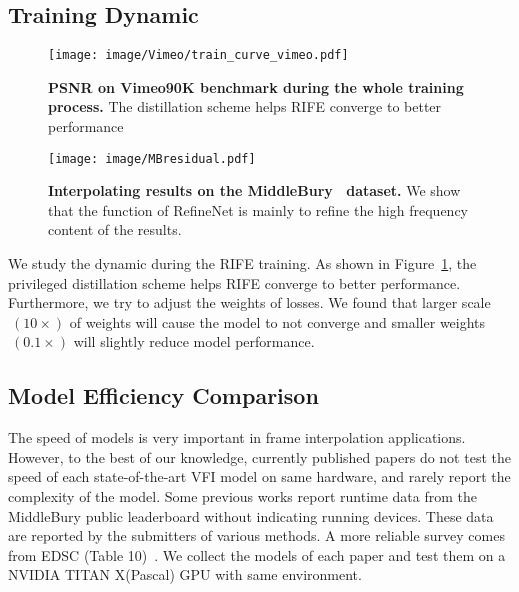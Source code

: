 \documentclass[final]{cvpr}
\begin{document}
\subsection{Training Dynamic}
\begin{figure}[ht]
	\centering
	\texttt{[image: image/Vimeo/train\_curve\_vimeo.pdf]}
	\caption{\textbf{PSNR on Vimeo90K benchmark during the whole training process. } The distillation scheme helps RIFE converge to better performance}\label{fig:dynamic}
\end{figure}

\begin{figure*}[t]
	\centering
	\texttt{[image: image/MBresidual.pdf]}
	\caption{\textbf{Interpolating results on the MiddleBury~\cite{baker2011database} dataset.} We show that the function of RefineNet is mainly to refine the high frequency content of the results.}\label{fig:mb}
\end{figure*}

We study the dynamic during the RIFE training. As shown in Figure~\ref{fig:dynamic}, the privileged distillation scheme helps RIFE converge to better performance. Furthermore, we try to adjust the weights of losses. We found that larger scale$~(10\times)$ of weights will cause the model to not converge and smaller weights$~(0.1\times)$ will slightly reduce model performance.


\subsection{Model Efficiency Comparison}
The speed of models is very important in frame interpolation applications. However, to the best of our knowledge, currently published papers do not test the speed of each state-of-the-art VFI model on same hardware, and rarely report the complexity of the model. Some previous works  report runtime data from the MiddleBury public leaderboard without indicating running devices. These data are reported by the submitters of various methods. A more reliable survey comes from EDSC (Table 10)~\cite{cheng2020multiple}. We collect the models of each paper and test them on a NVIDIA TITAN X(Pascal) GPU with same environment. 
 
\end{document}
